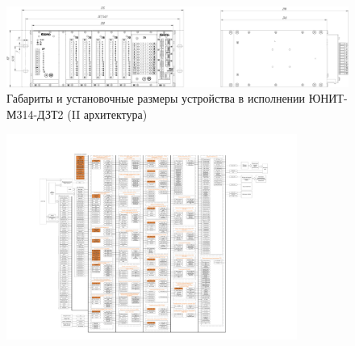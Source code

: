 \documentclass[a4paper, 12pt,table, hidelinks, DIV=calc]{extarticle} %
\begin{document}
\begin{appendices}
\begin{landscape}
\begin{figure}[h!]
  \centering
  \includegraphics[width=1.4\textwidth]{img40.png}
  \caption{Габариты и установочные размеры устройства в исполнении ЮНИТ-М314-ДЗТ2 (II архитектура)}
  \label{fig:frontviewDZT22} %
\end{figure}

\clearpage

\end{landscape}
\restoregeometry


\newpage
\newpage

\areaset{390mm}{270mm}
\fancyheadoffset{0pt} %

\topmargin=-2.6cm %
\oddsidemargin=0cm %
\headsep=0cm
\footskip=45pt
\setlength{\headheight}{1cm}

\color{black}

\begin{figure}[H]
\centering
\includegraphics[width=0.85\textwidth,height=0.85\textheight,keepaspectratio]{img41.pdf}
\end{figure}


\end{appendices}
\end{document}
